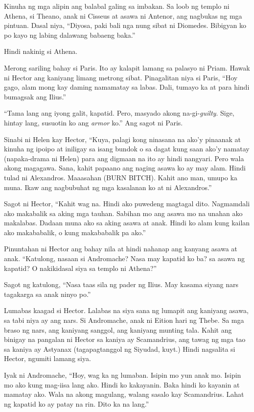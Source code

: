 \documentclass[12pt,letterpaper]{report}
\begin{document}
Kinuha ng mga alipin ang balabal galing sa imbakan. Sa loob ng templo ni Athena, si Theano, anak ni Cisseus at asawa ni Antenor, ang nagbukas ng mga pintuan. Dasal niya, ``Diyosa, paki bali nga nung sibat ni Diomedes. Bibigyan ko po kayo ng labing dalawang babaeng baka.''

Hindi nakinig si Athena.

Merong sariling bahay si Paris. Ito ay kalapit lamang sa palasyo ni Priam. Hawak ni Hector ang kaniyang limang metrong sibat. Pinagalitan niya si Paris, ``Hoy gago, alam mong kay daming namamatay sa labas. Dali, tumayo ka at para hindi bumagsak ang Ilius.''

``Tama lang ang iyong galit, kapatid. Pero, masyado akong na-gi-\textit{guilty}. Sige, hintay lang, susuotin ko ang \textit{armor} ko.'' Ang sagot ni Paris.

Sinabi ni Helen kay Hector, ``Kuya, palagi kong ninasana na ako'y pinaanak at kinuha ng ipoipo at iniligay sa isang bundok o sa dagat kung saan ako'y namatay (napaka-drama ni Helen) para ang digmaan na ito ay hindi nangyari. Pero wala akong magagawa. Sana, kahit papaano ang naging asawa ko ay may alam. Hindi tulad ni Alexandros. Maaasahan (BURN BITCH). Kahit ano man, umupo ka muna. Ikaw ang nagbubuhat ng mga kasalanan ko at ni Alexandros.''

Sagot ni Hector, ``Kahit wag na. Hindi ako puwedeng magtagal dito. Nagmamdali ako makabalik sa aking mga tauhan. Sabihan mo ang asawa mo na unahan ako makalabas. Dadaan muna ako sa aking asawa at anak. Hindi ko alam kung kailan ako makababalik, o kung makababalik pa ako.''

Pinuntahan ni Hector ang bahay nila at hindi nahanap ang kanyang asawa at anak. ``Katulong, nasaan si Andromache? Nasa may kapatid ko ba? sa asawa ng kapatid? O nakikidasal siya sa templo ni Athena?''

Sagot ng katulong, ``Nasa taas sila ng pader ng Ilius. May kasama siyang nars tagakarga sa anak ninyo po.''

Lumabas kaagad si Hector. Lalabas na siya sana ng lumapit ang kaniyang asawa, sa tabi niya ay ang nars. Si Andromache, anak ni Eition hari ng Thebe. Sa mga braso ng nars, ang kaniyang sanggol, ang kaniyang munting tala. Kahit ang binigay na pangalan ni Hector sa kaniya ay Scamandrius, ang tawag ng mga tao sa kaniya ay Astyanax (tagapagtanggol ng Siyudad, kuyt.) Hindi nagsalita si Hector, ngumiti lamang siya.

Iyak ni Andromache, ``Hoy, wag ka ng lumaban. Isipin mo yun anak mo. Isipin mo ako kung mag-iisa lang ako. Hindi ko kakayanin. Baka hindi ko kayanin at mamatay ako. Wala na akong magulang, walang sasalo kay Scamandrius. Lahat ng kapatid ko ay patay na rin. Dito ka na lang.''
\end{document}
